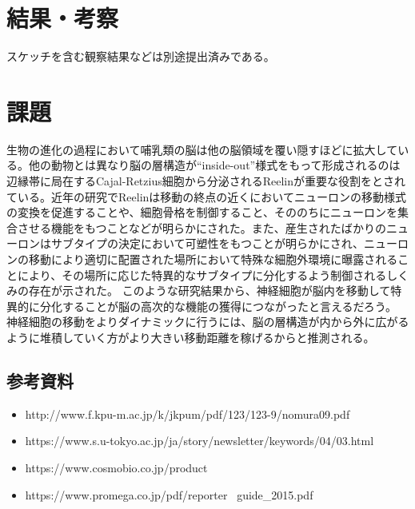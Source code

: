 \documentclass[a4paper,papersize,dvipdfmx]{jsarticle}
\begin{document}
\section*{結果・考察}
スケッチを含む観察結果などは別途提出済みである。

\section*{課題}
生物の進化の過程において哺乳類の脳は他の脳領域を覆い隠すほどに拡大している。他の動物とは異なり脳の層構造が“inside-out”様式をもって形成されるのは
辺縁帯に局在するCajal-Retzius細胞から分泌されるReelinが重要な役割をとされている。近年の研究でReelinは移動の終点の近くにおいてニューロンの移動様式の変換を促進することや、細胞骨格を制御すること、そののちにニューロンを集合させる機能をもつことなどが明らかにされた。また、産生されたばかりのニューロンはサブタイプの決定において可塑性をもつことが明らかにされ、ニューロンの移動により適切に配置された場所において特殊な細胞外環境に曝露されることにより、その場所に応じた特異的なサブタイプに分化するよう制御されるしくみの存在が示された。
このような研究結果から、神経細胞が脳内を移動して特異的に分化することが脳の高次的な機能の獲得につながったと言えるだろう。
神経細胞の移動をよりダイナミックに行うには、脳の層構造が内から外に広がるように堆積していく方がより大きい移動距離を稼げるからと推測される。


\subsection*{参考資料}
\small
\begin{itemize}
\item http://www.f.kpu-m.ac.jp/k/jkpum/pdf/123/123-9/nomura09.pdf
\item https://www.s.u-tokyo.ac.jp/ja/story/newsletter/keywords/04/03.html
\item https://www.cosmobio.co.jp/product
\item https://www.promega.co.jp/pdf/reporter \ guide\_2015.pdf
\end{itemize}
\end{document}
